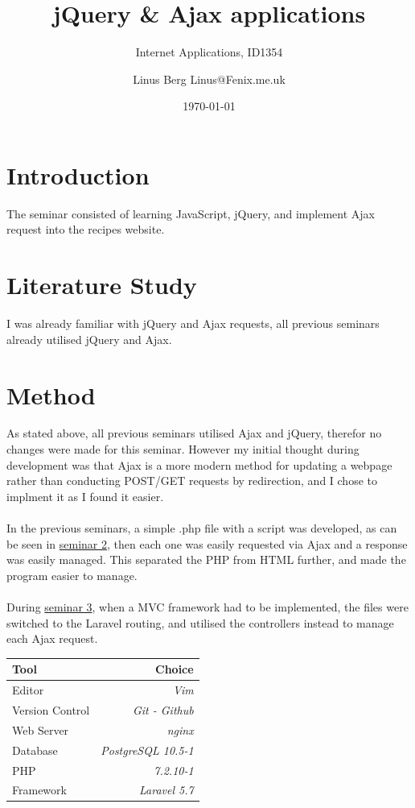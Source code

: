 \documentclass[a4paper]{scrartcl}
\title{jQuery \& Ajax applications}
\subtitle{Internet Applications, ID1354}
\author{Linus Berg Linus@Fenix.me.uk}
\date{\today}
\begin{document}
\maketitle

\section{Introduction}

The seminar consisted of learning JavaScript, jQuery, and implement Ajax request
into the recipes website.
\section{Literature Study}
I was already familiar with jQuery and Ajax requests, all previous seminars
already utilised jQuery and Ajax.

\section{Method}
As stated above, all previous seminars utilised Ajax and jQuery, therefor no
changes were made for this seminar. However my initial thought during development
was that Ajax is a more modern method for updating a webpage rather than conducting
POST/GET requests by redirection, and I chose to implment it as I found it easier.
\\\\
\noindent
In the previous seminars, a simple .php file with a script was developed,
as can be seen in \href{https://github.com/linus-dev/KTH-Projects/tree/master/ID1354/2}{seminar 2},
then each one was easily requested via Ajax and a response was easily managed.
This separated the PHP from HTML further, and made the program easier to manage.
\\\\
\noindent
During \href{https://github.com/linus-dev/KTH-Projects/tree/master/ID1354/3}{seminar 3}, when
a MVC framework had to be implemented, the files were switched to the Laravel routing, and utilised
the controllers instead to manage each Ajax request.

\begin{center}
    \begin{tabular}{  l | r }
    Tool & Choice \\ 
    \hline
    Editor & \textit{Vim}\\
    Version Control & \textit{Git - Github}\\
    Web Server & \textit{nginx}\\
    Database & \textit{PostgreSQL 10.5-1}\\
    PHP & \textit{7.2.10-1} \\
    Framework & \textit{Laravel 5.7}\\
    \end{tabular}
\end{center}
\end{document}
